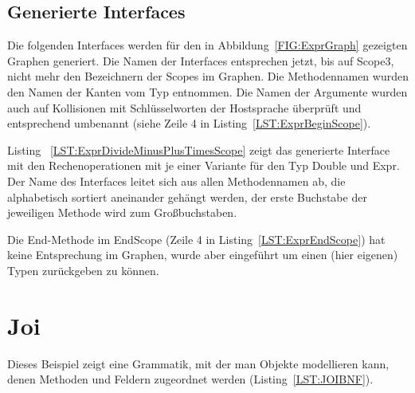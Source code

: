 \documentclass[../InterneDSLs.tex]{subfiles}
\begin{document}
\subsection{Generierte Interfaces}
Die folgenden Interfaces werden für den in Abbildung~\ref{FIG:ExprGraph} gezeigten Graphen generiert. Die Namen der Interfaces entsprechen jetzt, bis auf Scope3, nicht mehr den Bezeichnern der Scopes im Graphen. Die Methodennamen wurden den Namen der Kanten vom Typ  entnommen. Die Namen der Argumente wurden auch auf Kollisionen mit Schlüsselworten der Hostsprache überprüft und entsprechend umbenannt (siehe Zeile 4 in Listing~\ref{LST:ExprBeginScope}).
\begin{figure}[ht]
    
\end{figure}

\begin{figure}[ht]

\end{figure}

Listing ~\ref{LST:ExprDivideMinusPlusTimesScope} zeigt das generierte Interface mit den Rechenoperationen mit je einer Variante für den Typ Double und Expr. Der Name des Interfaces leitet sich aus allen Methodennamen ab, die alphabetisch sortiert aneinander gehängt werden, der erste Buchstabe der jeweiligen Methode wird zum Großbuchstaben.
\begin{figure}[ht]
    
\end{figure}

Die End-Methode im EndScope (Zeile 4 in Listing~\ref{LST:ExprEndScope}) hat keine Entsprechung im Graphen, wurde aber eingeführt um einen (hier eigenen) Typen zurückgeben zu können.
\begin{figure}[ht]
    
\end{figure}


\section{Joi}
Dieses Beispiel zeigt eine Grammatik, mit der man Objekte modellieren kann, denen Methoden und Feldern zugeordnet werden (Listing~\ref{LST:JOIBNF}).
\begin{figure}[ht]
    
\end{figure}
\end{document}
